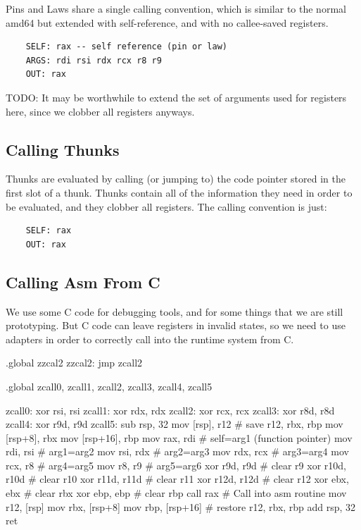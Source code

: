 Pins and Laws share a single calling convention, which is similar to the
normal amd64 but extended with self-reference, and with no callee-saved
registers.

\begin{verbatim}
    SELF: rax -- self reference (pin or law)
    ARGS: rdi rsi rdx rcx r8 r9
    OUT: rax
\end{verbatim}

TODO: It may be worthwhile to extend the set of arguments used for
registers here, since we clobber all registers anyways.

\subsection{Calling Thunks}

Thunks are evaluated by calling (or jumping to) the code pointer stored
in the first slot of a thunk.  Thunks contain all of the information
they need in order to be evaluated, and they clobber all registers. The
calling convention is just:

\begin{verbatim}
    SELF: rax
    OUT: rax
\end{verbatim}

\subsection{Calling Asm From C}

We use some C code for debugging tools, and for some things that we are
still prototyping.  But C code can leave registers in invalid states,
so we need to use adapters in order to correctly call into the runtime
system from C.

\begin{asm}
.global zzcal2
zzcal2:	jmp zcall2

.global zcall0, zcall1, zcall2, zcall3, zcall4, zcall5

zcall0: xor	rsi, rsi
zcall1: xor	rdx, rdx
zcall2: xor	rcx, rcx
zcall3: xor	r8d, r8d
zcall4: xor	r9d, r9d
zcall5:	sub	rsp, 32
	mov	[rsp], r12                  # save r12, rbx, rbp
	mov	[rsp+8], rbx
	mov	[rsp+16], rbp
	mov	rax, rdi                    # self=arg1 (function pointer)
	mov	rdi, rsi                    # arg1=arg2
	mov	rsi, rdx                    # arg2=arg3
	mov	rdx, rcx                    # arg3=arg4
	mov	rcx, r8                     # arg4=arg5
	mov	r8, r9                      # arg5=arg6
	xor	r9d, r9d                    # clear r9
	xor	r10d, r10d                  # clear r10
	xor	r11d, r11d                  # clear r11
	xor	r12d, r12d                  # clear r12
	xor	ebx, ebx                    # clear rbx
	xor	ebp, ebp                    # clear rbp
	call	rax                         # Call into asm routine
	mov	r12, [rsp]
	mov	rbx, [rsp+8]
	mov	rbp, [rsp+16]               # restore r12, rbx, rbp
	add	rsp, 32
	ret
\end{asm}



